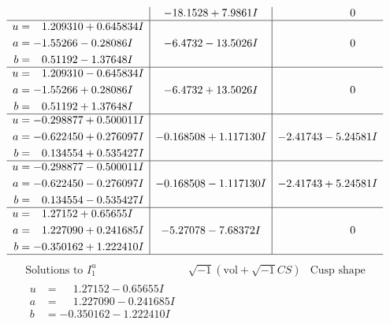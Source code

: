 \documentclass[1p]{elsarticle_modified}
\theoremstyle{definition}
\newcommand{\I}{\sqrt{-1}}
\begin{document}
$$\begin{array}{c|c|c}
 & -18.1528 + 7.9861 I & \phantom{-0.000000 } 0 \\ \hline\begin{aligned}
u &= \phantom{-}1.209310 + 0.645834 I \\
a &= -1.55266 - 0.28086 I \\
b &= \phantom{-}0.51192 - 1.37648 I\end{aligned}
 & -6.4732 - 13.5026 I & \phantom{-0.000000 } 0 \\ \hline\begin{aligned}
u &= \phantom{-}1.209310 - 0.645834 I \\
a &= -1.55266 + 0.28086 I \\
b &= \phantom{-}0.51192 + 1.37648 I\end{aligned}
 & -6.4732 + 13.5026 I & \phantom{-0.000000 } 0 \\ \hline\begin{aligned}
u &= -0.298877 + 0.500011 I \\
a &= -0.622450 + 0.276097 I \\
b &= \phantom{-}0.134554 + 0.535427 I\end{aligned}
 & -0.168508 + 1.117130 I & -2.41743 - 5.24581 I \\ \hline\begin{aligned}
u &= -0.298877 - 0.500011 I \\
a &= -0.622450 - 0.276097 I \\
b &= \phantom{-}0.134554 - 0.535427 I\end{aligned}
 & -0.168508 - 1.117130 I & -2.41743 + 5.24581 I \\ \hline\begin{aligned}
u &= \phantom{-}1.27152 + 0.65655 I \\
a &= \phantom{-}1.227090 + 0.241685 I \\
b &= -0.350162 + 1.222410 I\end{aligned}
 & -5.27078 - 7.68372 I & \phantom{-0.000000 } 0\\
 \hline 
 \end{array}$$\newpage$$\begin{array}{c|c|c}  
\text{Solutions to }I^u_{1}& \I (\text{vol} + \sqrt{-1}CS) & \text{Cusp shape}\\
 \hline 
\begin{aligned}
u &= \phantom{-}1.27152 - 0.65655 I \\
a &= \phantom{-}1.227090 - 0.241685 I \\
b &= -0.350162 - 1.222410 I\end{aligned}

\end{array}$$
\end{document}
